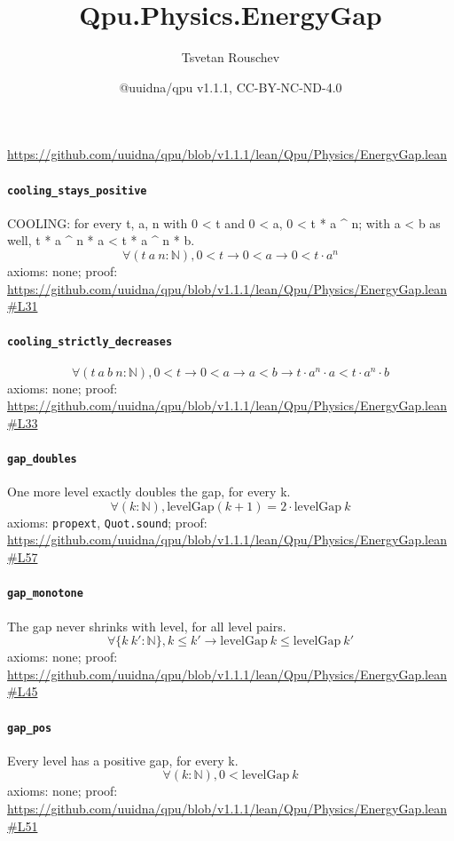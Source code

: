 \documentclass[11pt]{article}
\title{Qpu.Physics.EnergyGap}
\author{Tsvetan Rouschev}
\date{@uuidna/qpu v1.1.1, CC-BY-NC-ND-4.0}
\begin{document}
\maketitle
\noindent\url{https://github.com/uuidna/qpu/blob/v1.1.1/lean/Qpu/Physics/EnergyGap.lean}

\paragraph{\texttt{cooling\_stays\_positive}}
COOLING: for every t, a, n with 0 < t and 0 < a, 0 < t * a \^{} n; with a < b as well, t * a \^{} n * a < t * a \^{} n * b.
\[ \forall (t\ a\ n : \mathbb{N}), 0 < t \to 0 < a \to 0 < t \cdot a ^{n} \]
\noindent axioms: none; proof: \url{https://github.com/uuidna/qpu/blob/v1.1.1/lean/Qpu/Physics/EnergyGap.lean\#L31}

\paragraph{\texttt{cooling\_strictly\_decreases}}
\[ \forall (t\ a\ b\ n : \mathbb{N}), 0 < t \to 0 < a \to a < b \to t \cdot a ^{n} \cdot a < t \cdot a ^{n} \cdot b \]
\noindent axioms: none; proof: \url{https://github.com/uuidna/qpu/blob/v1.1.1/lean/Qpu/Physics/EnergyGap.lean\#L33}

\paragraph{\texttt{gap\_doubles}}
One more level exactly doubles the gap, for every k.
\[ \forall (k : \mathbb{N}), \mathrm{levelGap} (k + 1) = 2 \cdot \mathrm{levelGap}\ k \]
\noindent axioms: \texttt{propext}, \texttt{Quot.sound}; proof: \url{https://github.com/uuidna/qpu/blob/v1.1.1/lean/Qpu/Physics/EnergyGap.lean\#L57}

\paragraph{\texttt{gap\_monotone}}
The gap never shrinks with level, for all level pairs.
\[ \forall \{k\ k' : \mathbb{N}\}, k \le k' \to \mathrm{levelGap}\ k \le \mathrm{levelGap}\ k' \]
\noindent axioms: none; proof: \url{https://github.com/uuidna/qpu/blob/v1.1.1/lean/Qpu/Physics/EnergyGap.lean\#L45}

\paragraph{\texttt{gap\_pos}}
Every level has a positive gap, for every k.
\[ \forall (k : \mathbb{N}), 0 < \mathrm{levelGap}\ k \]
\noindent axioms: none; proof: \url{https://github.com/uuidna/qpu/blob/v1.1.1/lean/Qpu/Physics/EnergyGap.lean\#L51}
\end{document}
